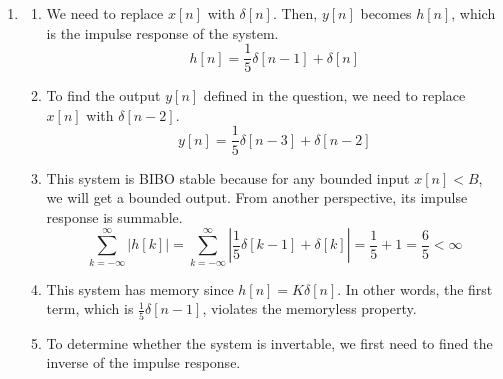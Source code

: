 \documentclass[10pt,a4paper, margin=1in]{article}
\begin{document}
\begin{enumerate}
\item %
    \begin{enumerate}
    \item %
    We need to replace $x[n]$ with $\delta [n]$. Then, $y[n]$ becomes $h[n]$, which is the impulse response of the system.
    $$h[n] = \frac{1}{5}\delta [n-1]+\delta[n]$$
    \item %
    To find the output $y[n]$ defined in the question, we need to replace $x[n]$ with $\delta [n-2]$.
    $$y[n] = \frac{1}{5}\delta [n-3]+\delta[n-2]$$
    \item %
    This system is BIBO stable because for any bounded input $x[n] < B$, we will get a bounded output. From another perspective, its impulse response is summable.
    $$\sum_{k=-\infty}^{\infty}|h[k]|=\sum_{k=-\infty}^{\infty}|\frac{1}{5}\delta [k-1]+\delta[k]|=\frac{1}{5}+1=\frac{6}{5}<\infty$$
    \item %
    This system has memory since $h[n] = K\delta [n]$. In other words, the first term, which is $\frac{1}{5}\delta [n-1]$, violates the memoryless property. 
    \item %
    To determine whether the system is invertable, we first need to fined the inverse of the impulse response.
    
    \end{enumerate}


\end{enumerate}
\end{document}
